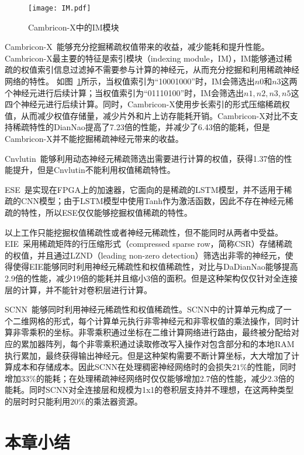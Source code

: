 \begin{figure}[h]
  \centering
  \texttt{[image: IM.pdf]}
  \caption{\footnotesize Cambricon-X中的IM模块}
  \label{fig:IM}
\end{figure}

Cambricon-X~\cite{zhang2016cambricon}能够充分挖掘稀疏权值带来的收益，减少能耗和提升性能。
Cambricon-X最主要的特征是索引模块（indexing module，IM），IM能够通过稀疏的权值索引信息过滤掉不需要参与计算的神经元，从而充分挖掘和利用稀疏神经网络的特性。
如图~\ref{fig:IM}所示，当权值索引为“10001000”时，IM会筛选出$n0$和$n3$这两个神经元进行后续计算；当权值索引为“01110100”时，IM会筛选出$n1, n2, n3, n5$这四个神经元进行后续计算。同时，Cambricon-X使用步长索引的形式压缩稀疏权值，从而减少权值存储量，减少片外和片上访存能耗开销。Cambricon-X对比不支持稀疏特性的DianNao提高了7.23倍的性能，并减少了6.43倍的能耗，但是Cambricon-X并不能挖掘稀疏神经元带来的收益。

Cnvlutin~\cite{albericio2016cnvlutin}能够利用动态神经元稀疏筛选出需要进行计算的权值，获得1.37倍的性能提升，但是Cnvlutin不能利用权值稀疏特性。

ESE~\cite{han2017ese}是实现在FPGA上的加速器，它面向的是稀疏的LSTM模型，并不适用于稀疏的CNN模型；由于LSTM模型中使用Tanh作为激活函数，因此不存在神经元稀疏的特性，所以ESE仅仅能够挖掘权值稀疏的特性。

以上工作只能挖掘权值稀疏性或者神经元稀疏性，但不能同时从两者中受益。EIE~\cite{han2016eie}采用稀疏矩阵的行压缩形式（compressed sparse row，简称CSR）存储稀疏的权值，并且通过LZND（leading non-zero detection）筛选出非零的神经元，使得使得EIE能够同时利用神经元稀疏性和权值稀疏性，对比与DaDianNao能够提高2.9倍的性能，减少19倍的能耗并且缩小3倍的面积。但是这种架构仅仅针对全连接层的计算，并不能针对卷积层进行计算。

SCNN~\cite{angshuman2017scnn}能够同时利用神经元稀疏性和权值稀疏性。SCNN中的计算单元构成了一个二维网格的形式，每个计算单元执行非零神经元和非零权值的乘法操作，同时计算非零乘积的坐标。非零乘积通过坐标在二维计算网络进行路由，最终被分配给对应的累加器阵列，每个非零乘积通过读取修改写入操作对包含部分和的本地RAM执行累加，最终获得输出神经元。但是这种架构需要不断计算坐标，大大增加了计算成本和存储成本。因此SCNN在处理稠密神经网络时的会损失$21\%$的性能，同时增加$33\%$的能耗；在处理稀疏神经网络时仅仅能够增加2.7倍的性能，减少2.3倍的能耗。同时SCNN对全连接层和规模为1x1的卷积层支持并不理想，在这两种类型的层时时只能利用$20\%$的乘法器资源。
 
\section{本章小结}

